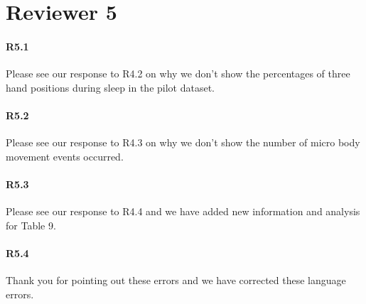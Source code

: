 \section*{Reviewer 5}

\paragraph{R5.1} Please see our response to R4.2 on why we don't show the percentages of three hand positions during sleep in the pilot dataset.


\paragraph{R5.2} Please see our response to R4.3 on why we don't show the number of micro body movement events occurred.

\paragraph{R5.3} Please see our response to R4.4 and we have added new information and analysis for Table 9.

\paragraph{R5.4} Thank you for pointing out these errors and we have corrected these language errors.

